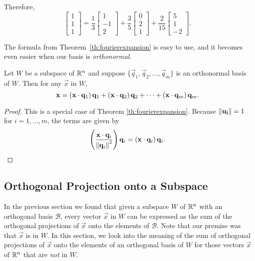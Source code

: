 \documentclass{ximera}
\begin{document}
\begin{example}
\begin{explanation}
Therefore,
\[ \begin{bmatrix}
1 \\ 1 \\ 1
\end{bmatrix}
= \frac{1}{3}\begin{bmatrix}
1 \\ -1 \\ 2
\end{bmatrix}
+\frac{3}{5}\begin{bmatrix}
0 \\ 2 \\ 1
\end{bmatrix}
+\frac{2}{15}\begin{bmatrix}
5 \\ 1 \\ -2
\end{bmatrix}.\]
\end{explanation} 
\end{example}

The formula from Theorem~\ref{th:fourierexpansion} is easy to use, and it becomes even easier when our basis is \emph{orthonormal}.

\begin{corollary}\label{cor:orthonormal}
Let $W$ be a subspace of $\mathbb{R}^n$ and suppose $\{ \vec{q}_1, \vec{q}_2, \ldots, \vec{q}_m \}$
is an orthonormal basis of $W$.
Then for any $\vec{x}$ in $W$,
\[ \mathbf{x} =
\left(\mathbf{x}\cdot \mathbf{q}_1\right) \mathbf{q}_1 +
\left(\mathbf{x}\cdot \mathbf{q}_2\right) \mathbf{q}_2 +
\cdots +
\left(\mathbf{x}\cdot \mathbf{q}_m\right)  \mathbf{q}_m.
\]
\end{corollary}
\begin{proof}
This is a special case of Theorem \ref{th:fourierexpansion}.  Because $\left\lVert\mathbf{u_i}\right\rVert = 1$ for $i=1,\ldots,m$, %
the terms are given by 
$$\left(\frac{\mathbf{x}\cdot \mathbf{q}_i}{\left\lVert\mathbf{q}_i\right\rVert^2}\right)\mathbf{q}_i=\left(\mathbf{x}\cdot \mathbf{q}_i\right) \mathbf{q}_i.$$

\end{proof}

\subsection*{Orthogonal Projection onto a Subspace}
In the previous section we found that given a subspace $W$ of $\mathbb{R}^n$ with an orthogonal basis $\mathcal{B}$, every vector $\vec{x}$ in $W$ can be expressed as the sum of the orthogonal projections of $\vec{x}$ onto the elements of $\mathcal{B}$.  Note that our premise was that $\vec{x}$ is in $W$.  In this section, we look into the meaning of the sum of orthogonal projections of $\vec{x}$ onto the elements of an orthogonal basis of $W$ for those vectors $\vec{x}$ of $\mathbb{R}^n$ that are \emph{not} in $W$.
\end{document}
